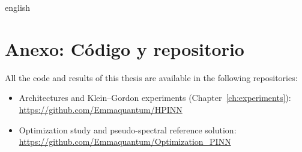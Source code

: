 \documentclass[0000.tex]{subfiles}
\begin{document}

\begin{hyphenrules}{english}

\chapter{Anexo: Código y repositorio}
All the code and results of this thesis are available in the following repositories:
\begin{itemize}
  \item Architectures and Klein--Gordon experiments (Chapter~\ref{ch:experiments}):
    \url{https://github.com/Emmaquantum/HPINN}
  \item Optimization study and pseudo-spectral reference solution:
    \url{https://github.com/Emmaquantum/Optimization_PINN}
\end{itemize}

\end{hyphenrules}

\ifSubfilesClassLoaded{}{}
\end{document}
